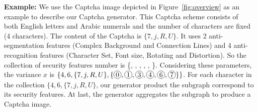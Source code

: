 \textbf{Example:} We use the Captcha image depicted in Figure~\ref{fig:overview} as an example to describe our Captcha generator. This Captcha scheme consists of both English letters and Arabic numerals and the number of characters are fixed (4 characters). The content of the Captcha is $\{7, j, R, U\}$.
It uses 2 anti-segmentation features (Complex Background and Connection Lines) and 4 anti-recognition features (Character Set, Font size, Rotating and Distortion). So the collection of security features number is \{, , , , , \}.
Considering these parameters, the variance $x$ is $\{4, 6, \{7, j, R, U\}, \{\circled{\small 0}, \circled{\small 1}, \circled{\small 3}, \circled{\small 4}, \circled{\small 6}, \circled{\small 7}\}\}$.
For each character in the collection $\{4, 6, \{7, j, R, U\}$, our generator product the subgraph correspond to its security features. At last, the generator aggregates the subgraph to produce a Captcha image.

